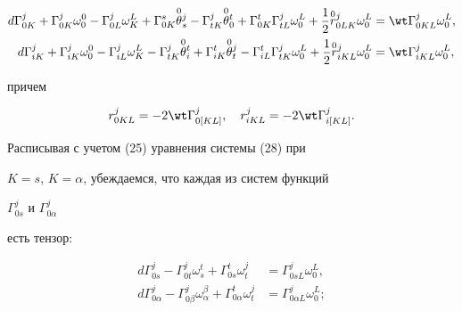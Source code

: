 \begin{align} 


d\Gamma^j_{0K}+\Gamma^j_{0K}\omega^0_0-\Gamma^j_{0L} 


\omega^L_K+\Gamma^s_{0K}\up{0}{\theta}^j_s- 


\Gamma^j_{t K}\up{0}{\theta}^t_0+\Gamma^t_{0K} 


\Gamma^j_{t L}\omega^L_0+\frac{1}{2}\up{0}{r}^j_{0L K} 


\omega^L_0&=\wt\Gamma^j_{0K L}\omega^L_0,\\ 


% 


d\Gamma^j_{i K}+\Gamma^j_{i K}\omega^0_0- 


\Gamma^j_{i L}\omega^L_K-\Gamma^j_{t K} 


\up{0}{\theta}^t_i+\Gamma^t_{i K}\up{0}{\theta}^j_t 


-\Gamma^t_{i L}\Gamma^j_{t K}\omega^L_0+\frac{1}{2} 


\up{0}{r}^j_{i K L}\omega^L_0&=\wt\Gamma^j_{i K L}\omega^L_0, 


\end{align} 


причем 


\begin{equation} 


r^j_{0K L}=-2\wt\Gamma^j_{0[K L]},\quad 


r^j_{i K L}=-2\wt\Gamma^j_{i[K L]}. 


\end{equation} 


 


Расписывая с учетом (25) уравнения системы (28) при 


$K=s$, $K=\alpha$, убеждаемся, что каждая из систем функций 


$\Gamma^j_{0s}$ и $\Gamma^j_{0\alpha}$ 


есть тензор: 


\begin{equation} 


\begin{split} 


d\Gamma^j_{0s}-\Gamma^j_{0t}\omega^t_s+ 


\Gamma^t_{0s}\omega^j_t&=\Gamma^j_{0s L}\omega^L_0,\\ 


d\Gamma^j_{0\alpha}-\Gamma^j_{0\beta}\omega^\beta_\alpha+ 


\Gamma^t_{0\alpha}\omega^j_t&=\Gamma^j_{0\alpha L}\omega^L_0; 


\end{split} 


\end{equation} 


